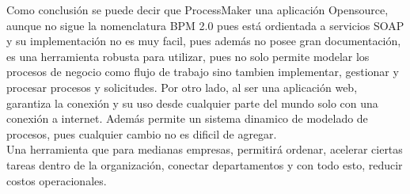 Como conclusión se puede decir que ProcessMaker una aplicación Opensource, aunque no sigue la nomenclatura BPM 2.0  pues está ordientada a servicios SOAP y su implementación no es muy facil, pues además no  posee gran documentación,  es una herramienta robusta para utilizar, pues no solo permite modelar los procesos de negocio como flujo de trabajo sino tambien implementar, gestionar y procesar procesos y solicitudes. Por otro lado, al ser una aplicación web, garantiza la conexión y su uso desde cualquier parte del mundo solo con  una conexión a internet. Además permite un sistema dinamico de modelado de procesos, pues cualquier cambio no es dificil de agregar.
\\
Una herramienta que para medianas empresas, permitirá ordenar,  acelerar ciertas tareas dentro de la organización, conectar departamentos y con todo esto, reducir costos operacionales.